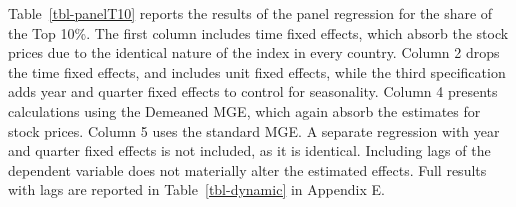 \documentclass[
  a4paper,
  DIV=11,
  numbers=noendperiod]{scrartcl}
\begin{document}
\begin{table}

\caption{\label{tbl-panelT10}Top 10\% Panel Regression}


\end{table}%

Table~\ref{tbl-panelT10} reports the results of the panel regression for
the share of the Top 10\%. The first column includes time fixed effects,
which absorb the stock prices due to the identical nature of the index
in every country. Column 2 drops the time fixed effects, and includes
unit fixed effects, while the third specification adds year and quarter
fixed effects to control for seasonality. Column 4 presents calculations
using the Demeaned MGE, which again absorb the estimates for stock
prices. Column 5 uses the standard MGE. A separate regression with year
and quarter fixed effects is not included, as it is identical. Including
lags of the dependent variable does not materially alter the estimated
effects. Full results with lags are reported in Table~\ref{tbl-dynamic}
in Appendix E.
\end{document}

